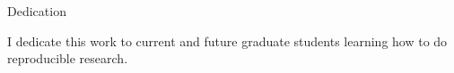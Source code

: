
\LARGE
Dedication

\normalsize
I dedicate this work to current and future graduate students learning how to do reproducible research.

\newpage
